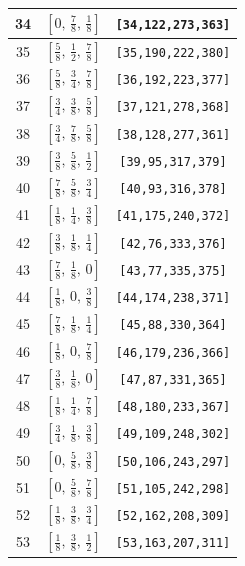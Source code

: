 \documentclass[fleqn,8pt]{jsarticle}
\begin{document}
\begin{longtable}{ccc}
34 & $\left[ 0,\, \frac{7}{8},\, \frac{1}{8} \right]$ & {\tt [34,122,273,363]} \\ \hline
35 & $\left[ \frac{5}{8},\, \frac{1}{2},\, \frac{7}{8} \right]$ & {\tt [35,190,222,380]} \\ \hline
36 & $\left[ \frac{5}{8},\, \frac{3}{4},\, \frac{7}{8} \right]$ & {\tt [36,192,223,377]} \\ \hline
37 & $\left[ \frac{3}{4},\, \frac{3}{8},\, \frac{5}{8} \right]$ & {\tt [37,121,278,368]} \\ \hline
38 & $\left[ \frac{3}{4},\, \frac{7}{8},\, \frac{5}{8} \right]$ & {\tt [38,128,277,361]} \\ \hline
39 & $\left[ \frac{3}{8},\, \frac{5}{8},\, \frac{1}{2} \right]$ & {\tt [39,95,317,379]} \\ \hline
40 & $\left[ \frac{7}{8},\, \frac{5}{8},\, \frac{3}{4} \right]$ & {\tt [40,93,316,378]} \\ \hline
41 & $\left[ \frac{1}{8},\, \frac{1}{4},\, \frac{3}{8} \right]$ & {\tt [41,175,240,372]} \\ \hline
42 & $\left[ \frac{3}{8},\, \frac{1}{8},\, \frac{1}{4} \right]$ & {\tt [42,76,333,376]} \\ \hline
43 & $\left[ \frac{7}{8},\, \frac{1}{8},\, 0 \right]$ & {\tt [43,77,335,375]} \\ \hline
44 & $\left[ \frac{1}{8},\, 0,\, \frac{3}{8} \right]$ & {\tt [44,174,238,371]} \\ \hline
45 & $\left[ \frac{7}{8},\, \frac{1}{8},\, \frac{1}{4} \right]$ & {\tt [45,88,330,364]} \\ \hline
46 & $\left[ \frac{1}{8},\, 0,\, \frac{7}{8} \right]$ & {\tt [46,179,236,366]} \\ \hline
47 & $\left[ \frac{3}{8},\, \frac{1}{8},\, 0 \right]$ & {\tt [47,87,331,365]} \\ \hline
48 & $\left[ \frac{1}{8},\, \frac{1}{4},\, \frac{7}{8} \right]$ & {\tt [48,180,233,367]} \\ \hline
49 & $\left[ \frac{3}{4},\, \frac{1}{8},\, \frac{3}{8} \right]$ & {\tt [49,109,248,302]} \\ \hline
50 & $\left[ 0,\, \frac{5}{8},\, \frac{3}{8} \right]$ & {\tt [50,106,243,297]} \\ \hline
51 & $\left[ 0,\, \frac{5}{8},\, \frac{7}{8} \right]$ & {\tt [51,105,242,298]} \\ \hline
52 & $\left[ \frac{1}{8},\, \frac{3}{8},\, \frac{3}{4} \right]$ & {\tt [52,162,208,309]} \\ \hline
53 & $\left[ \frac{1}{8},\, \frac{3}{8},\, \frac{1}{2} \right]$ & {\tt [53,163,207,311]} \\ \hline

\end{longtable}
\end{document}
